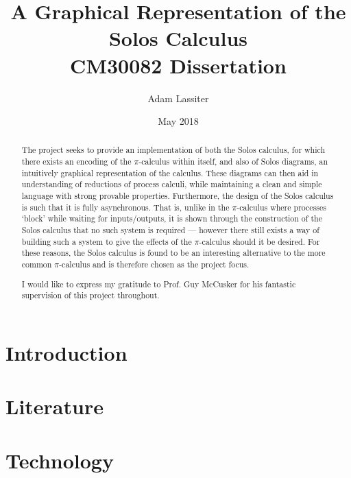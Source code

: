 \documentclass{article}
\title{A Graphical Representation of the Solos Calculus \\
	\large CM30082 Dissertation}
\author{Adam Lassiter}
\date{May 2018}
\begin{document}
    
    \maketitle
    \vspace{\fill}
    \begin{abstract}
        The project seeks to provide an implementation of both the Solos calculus, for which there exists an encoding of the $\pi$-calculus within itself, and also of Solos diagrams, an intuitively graphical representation of the calculus. These diagrams can then aid in understanding of reductions of process calculi, while maintaining a clean and simple language with strong provable properties.
        Furthermore, the design of the Solos calculus is such that it is fully asynchronous. That is, unlike in the $\pi$-calculus where processes `block' while waiting for inputs/outputs, it is shown through the construction of the Solos calculus that no such system is required --- however there still exists a way of building such a system to give the effects of the $\pi$-calculus should it be desired.
        For these reasons, the Solos calculus is found to be an interesting alternative to the more common $\pi$-calculus and is therefore chosen as the project focus.
    \end{abstract}
    \vspace{\fill}
    \pagebreak

    \renewcommand{\abstractname}{Acknowledgements}
    \begin{abstract}
        I would like to express my gratitude to Prof. Guy McCusker for his fantastic supervision of this project throughout.
    \end{abstract}
    \vspace{\fill}
    \tableofcontents
    \vspace{\fill}
    \pagebreak

    \section{Introduction}

    \section{Literature}
        
        
        
        
        

    \section{Technology}
        
\end{document}
